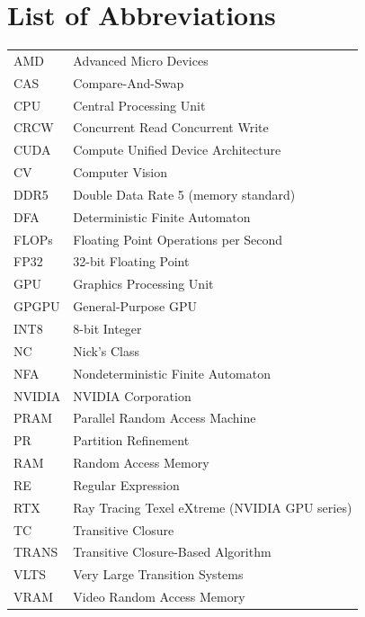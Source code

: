 \section*{List of Abbreviations}

\begin{tabular}{ll}
AMD & Advanced Micro Devices \\
CAS & Compare-And-Swap \\
CPU & Central Processing Unit \\
CRCW & Concurrent Read Concurrent Write \\
CUDA & Compute Unified Device Architecture \\
CV & Computer Vision \\
DDR5 & Double Data Rate 5 (memory standard) \\
DFA & Deterministic Finite Automaton \\
FLOPs & Floating Point Operations per Second \\
FP32 & 32-bit Floating Point \\
GPU & Graphics Processing Unit \\
GPGPU & General-Purpose GPU \\
INT8 & 8-bit Integer \\
NC & Nick's Class \\
NFA & Nondeterministic Finite Automaton \\
NVIDIA & NVIDIA Corporation \\
PRAM & Parallel Random Access Machine \\
PR & Partition Refinement \\
RAM & Random Access Memory \\
RE & Regular Expression \\
RTX & Ray Tracing Texel eXtreme (NVIDIA GPU series) \\
TC & Transitive Closure \\
TRANS & Transitive Closure-Based Algorithm \\
VLTS & Very Large Transition Systems \\
VRAM & Video Random Access Memory \\
\end{tabular}

